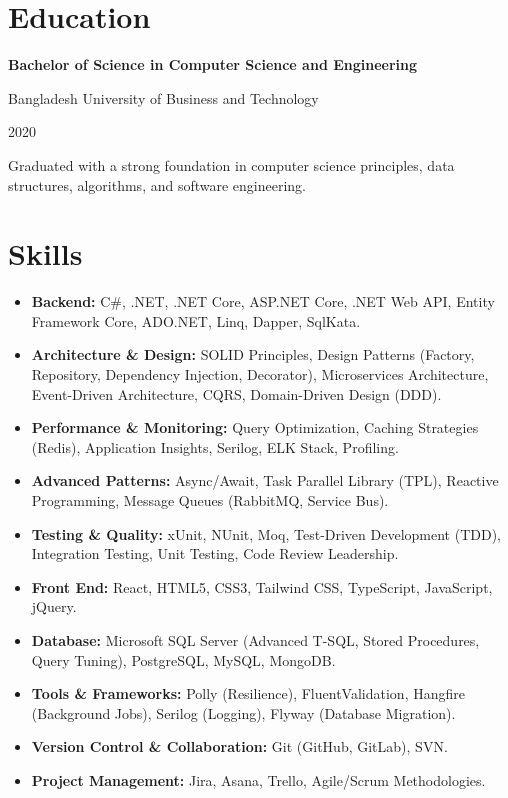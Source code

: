 \documentclass[a4paper,10pt]{article}
\begin{document}
\section{Education}

\textbf{Bachelor of Science in Computer Science and Engineering}\par
{\small\color{metagray} Bangladesh University of Business and Technology}\par
{\small\color{metagray} 2020}\par
\vspace{0.3em}
Graduated with a strong foundation in computer science principles, data structures,
algorithms, and software engineering.

\section{Skills}

\begin{itemize}
  \item \textbf{Backend:} C\#, .NET, .NET Core, ASP.NET Core, .NET Web API, Entity Framework Core, ADO.NET, Linq, Dapper, SqlKata.
  \item \textbf{Architecture \& Design:} SOLID Principles, Design Patterns (Factory, Repository, Dependency Injection, Decorator), Microservices Architecture, Event-Driven Architecture, CQRS, Domain-Driven Design (DDD).
  \item \textbf{Performance \& Monitoring:} Query Optimization, Caching Strategies (Redis), Application Insights, Serilog, ELK Stack, Profiling.
  \item \textbf{Advanced Patterns:} Async/Await, Task Parallel Library (TPL), Reactive Programming, Message Queues (RabbitMQ, Service Bus).
  \item \textbf{Testing \& Quality:} xUnit, NUnit, Moq, Test-Driven Development (TDD), Integration Testing, Unit Testing, Code Review Leadership.
  \item \textbf{Front End:} React, HTML5, CSS3, Tailwind CSS, TypeScript, JavaScript, jQuery.
  \item \textbf{Database:} Microsoft SQL Server (Advanced T-SQL, Stored Procedures, Query Tuning), PostgreSQL, MySQL, MongoDB.
  \item \textbf{Tools \& Frameworks:} Polly (Resilience), FluentValidation, Hangfire (Background Jobs), Serilog (Logging), Flyway (Database Migration).
  \item \textbf{Version Control \& Collaboration:} Git (GitHub, GitLab), SVN.
  \item \textbf{Project Management:} Jira, Asana, Trello, Agile/Scrum Methodologies.
\end{itemize}
\end{document}
